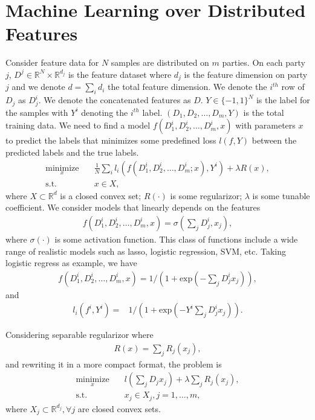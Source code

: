\section{Machine Learning over Distributed Features}
Consider feature data for $N$ samples are distributed on $m$ parties. On each party $j$, $D^j\in\mathbb{R}^N\times\mathbb{R}^{d_j}$ is the feature dataset where $d_j$ is the feature dimension on party $j$ and we denote $d=\sum_id_i$ the total feature dimension. We denote the $i^{th}$ row of $D_j$ as $D_j^i$. We denote the concatenated features as $D$. $Y\in\{-1, 1\}^N$ is the label for the samples with $Y^i$ denoting the $i^{th}$ label. $(D_1, D_2, \ldots, D_m, Y)$ is the total training data. We need to find a model $f(D_1^i, D_2^i, \ldots, D_m^i, x)$ with parameters $x$ to predict the labels that minimizes some predefined loss $l(f, Y)$ between the predicted labels and the true labels. 
\begin{align}
\underset{x}{\text{minimize}}&\quad\frac{1}{N}\sum_i l_i(f(D_1^i, D_2^i, \ldots, D_m^i; x), Y^i) + \lambda R(x), \label{eq:ori_problem}\\
\text{s.t.}&\quad x \in X,
\end{align}
where $X\subset\mathbb{R}^d$ is a closed convex set; $R(\cdot)$ is some regularizor; $\lambda$ is some tunable coefficient. 
We consider models that linearly depends on the features
\begin{align}
f(D_1^i, D_2^i, \ldots, D_m^i, x) = \sigma(\sum_j D_j^i, x_j),
\end{align}
where $\sigma(\cdot)$ is some activation function. This class of functions include a wide range of realistic models such as lasso, logistic regression, SVM, etc. 
Taking logistic regress as example, we have
\begin{align}
f(D_1^i, D_2^i, \ldots, D_m^i, x) = 1/(1+\text{exp}(-\sum_j D_j^ix_j)),
\end{align}
and 
\begin{align}
l_i(f^i, Y^i) = & 1/(1+\text{exp}(-Y^i\sum_j D_j^ix_j)).
\end{align}

Considering separable regularizor where
\begin{align}
R(x) = \sum_j R_j(x_j),
\end{align}
and rewriting it in a more compact format, the problem is 
\begin{align}
\underset{x}{\text{minimize}}&\quad l\left(\sum_j D_jx_j\right) + \lambda\sum_j R_j(x_j), \label{eq:analysis_problem}\\
\text{s.t.}&\quad x_j\in X_j, j=1,\ldots,m,
\end{align}
where  $X_j\subset\mathbb{R}^{d_j}, \forall j$ are closed convex sets. 

